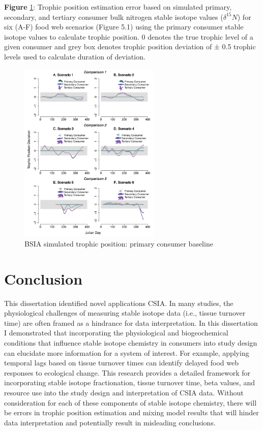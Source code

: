 \documentclass [11pt, proquest] {uwthesis}[2015/03/03]
\begin{document}
\textbf{Figure} \ref{fig:BSIATP2}: Trophic position estimation error
based on simulated primary, secondary, and tertiary consumer bulk
nitrogen stable isotope values (\(\delta^{15}N\)) for six (A-F) food web
scenarios (Figure 5.1) using the primary consumer stable isotope values
to calculate trophic position. 0 denotes the true trophic level of a
given consumer and grey box denotes trophic position deviation of ± 0.5
trophic levels used to calculate duration of deviation. \newline 
\begin{figure}[h]
\centering
  \includegraphics[width=0.6\textwidth]{figure/Ch5/Figure12.pdf}
  \caption{BSIA simulated trophic position: primary consumer baseline}
  \label{fig:BSIATP2}
\end{figure}
\clearpage

\chapter*{Conclusion}\label{conclusion}

This dissertation identified novel applications CSIA. In many studies,
the physiological challenges of measuring stable isotope data (i.e.,
tissue turnover time) are often framed as a hindrance for data
interpretation. In this dissertation I demonstrated that incorporating
the physiological and biogeochemical conditions that influence stable
isotope chemistry in consumers into study design can elucidate more
information for a system of interest. For example, applying temporal
lags based on tissue turnover times can identify delayed food web
responses to ecological change. This research provides a detailed
framework for incorporating stable isotope fractionation, tissue
turnover time, beta values, and resource use into the study design and
interpretation of CSIA data. Without consideration for each of these
components of stable isotope chemistry, there will be errors in trophic
position estimation and mixing model results that will hinder data
interpretation and potentially result in misleading conclusions.
\end{document}

